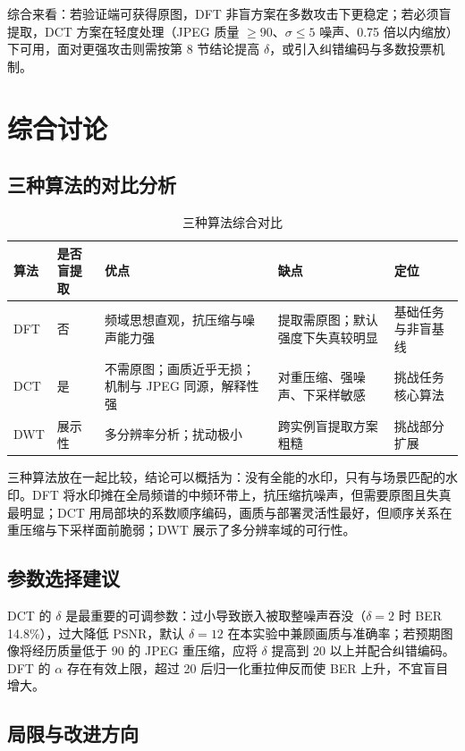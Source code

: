 \documentclass[11pt]{ctexart}
\begin{document}
综合来看：若验证端可获得原图，DFT 非盲方案在多数攻击下更稳定；若必须盲提取，DCT 方案在轻度处理（JPEG 质量 $\ge90$、$\sigma\le5$ 噪声、0.75 倍以内缩放）下可用，面对更强攻击则需按第 8 节结论提高 $\delta$，或引入纠错编码与多数投票机制。

\section{综合讨论}

\subsection{三种算法的对比分析}

\begin{table}[H]
  \centering
  \caption{三种算法综合对比}
  \label{tab:compare}
  \begin{tabular}{lp{2cm}p{4cm}p{4cm}p{2.6cm}}
    \toprule
    算法 & 是否盲提取 & 优点 & 缺点 & 定位 \\
    \midrule
    DFT & 否 & 频域思想直观，抗压缩与噪声能力强 & 提取需原图；默认强度下失真较明显 & 基础任务与非盲基线 \\
    DCT & 是 & 不需原图；画质近乎无损；机制与 JPEG 同源，解释性强 & 对重压缩、强噪声、下采样敏感 & 挑战任务核心算法 \\
    DWT & 展示性 & 多分辨率分析；扰动极小 & 跨实例盲提取方案粗糙 & 挑战部分扩展 \\
    \bottomrule
  \end{tabular}
\end{table}

三种算法放在一起比较，结论可以概括为：没有全能的水印，只有与场景匹配的水印。DFT 将水印摊在全局频谱的中频环带上，抗压缩抗噪声，但需要原图且失真最明显；DCT 用局部块的系数顺序编码，画质与部署灵活性最好，但顺序关系在重压缩与下采样面前脆弱；DWT 展示了多分辨率域的可行性。

\subsection{参数选择建议}

DCT 的 $\delta$ 是最重要的可调参数：过小导致嵌入被取整噪声吞没（$\delta=2$ 时 BER 14.8\%），过大降低 PSNR，默认 $\delta=12$ 在本实验中兼顾画质与准确率；若预期图像将经历质量低于 90 的 JPEG 重压缩，应将 $\delta$ 提高到 20 以上并配合纠错编码。DFT 的 $\alpha$ 存在有效上限，超过 20 后归一化重拉伸反而使 BER 上升，不宜盲目增大。

\subsection{局限与改进方向}
\end{document}
